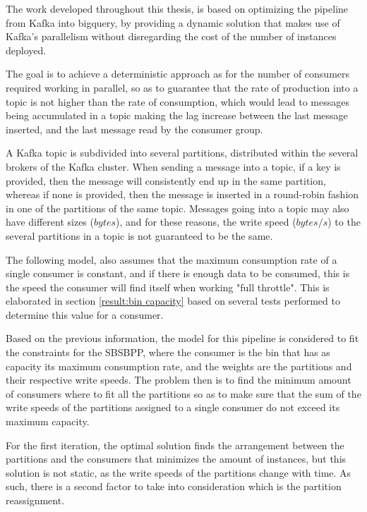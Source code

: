 The work developed throughout this thesis, is based on optimizing the pipeline
from Kafka into bigquery, by providing a dynamic solution that makes use of
Kafka's parallelism without disregarding the cost of the number of instances
deployed. 

The goal is to achieve a deterministic approach as for the number of consumers
required working in parallel, so as to guarantee that the rate of production
into a topic is not higher than the rate of consumption, which would lead to
messages being accumulated in a topic making the lag increase between the last
message inserted, and the last message read by the consumer group.

A Kafka topic is subdivided into several partitions, distributed within the
several brokers of the Kafka cluster. When sending a message into a topic, if a
key is provided, then the message will consistently end up in the same
partition, whereas if none is provided, then the message is inserted in a
round-robin fashion in one of the partitions of the same topic. Messages going
into a topic may also have different sizes ($bytes$), and for these reasons, the
write speed ($bytes/s$) to the several partitions in a topic is not guaranteed
to be the same. 

The following model, also assumes that the maximum consumption rate of a single
consumer is constant, and if there is enough data to be consumed, this is the
speed the consumer will find itself when working "full throttle". This is
elaborated in section \ref{result:bin capacity} based on several tests performed
to determine this value for a consumer. 

Based on the previous information, the model for this pipeline is considered to
fit the constraints for the SBSBPP, where the consumer is the bin that has as
capacity its maximum consumption rate, and the weights are the partitions and
their respective write speeds. The problem then is to find the minimum amount of
consumers where to fit all the partitions so as to make sure that the sum of the
write speeds of the partitions assigned to a single consumer do not exceed its
maximum capacity. 

For the first iteration, the optimal solution finds the arrangement between the
partitions and the consumers that minimizes the amount of instances, but this
solution is not static, as the write speeds of the partitions change with time.
As such, there is a second factor to take into consideration which is the
partition reassignment. 

